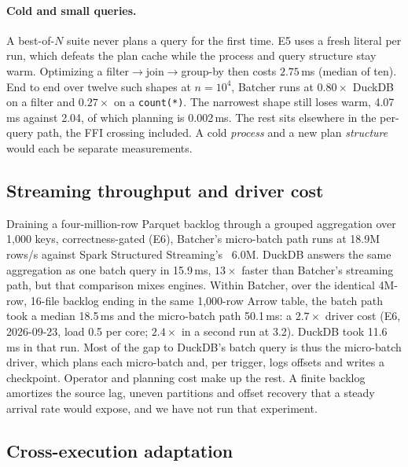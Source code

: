 \documentclass[10pt,twocolumn,letterpaper]{article}   %
\newcommand{\sys}{Batcher}
\newcommand{\E}[1]{\textsf{E#1}}
\begin{document}
\paragraph{Cold and small queries.}
\label{sec:smallquery}
A best-of-$N$ suite never plans a query for the first time. \E{5} uses a fresh literal per run,
which defeats the plan cache while the process and query structure stay warm. Optimizing a
filter$\rightarrow$join$\rightarrow$group-by then costs $2.75$\,ms (median of ten). End to end
over twelve such shapes at $n=10^4$, \sys{} runs at $0.80\times$ DuckDB on a filter and
$0.27\times$ on a \texttt{count(*)}. The narrowest shape still loses warm, 4.07\,ms against 2.04,
of which planning is 0.002\,ms. The rest sits elsewhere in the per-query path, the FFI crossing
included. A cold \emph{process} and a new plan \emph{structure} would each be separate
measurements.

\subsection{Streaming throughput and driver cost}
\label{sec:eval-streaming}

Draining a four-million-row Parquet backlog through a grouped aggregation over 1{,}000 keys,
correctness-gated (\E{6}), \sys{}'s micro-batch path runs at 18.9M rows/s against Spark
Structured Streaming's~\cite{armbrust2018structured} 6.0M. DuckDB answers the same aggregation
as one batch query in 15.9\,ms, $13\times$ faster than \sys{}'s streaming path, but that
comparison mixes engines. Within \sys{}, over the identical 4M-row, 16-file backlog ending in
the same 1{,}000-row Arrow table, the batch path took a median 18.5\,ms and the micro-batch path
50.1\,ms: a $2.7\times$ driver cost (\E{6}, 2026-09-23, load 0.5 per core; $2.4\times$ in a
second run at 3.2). DuckDB took 11.6\,ms in that run. Most of the gap to DuckDB's batch query is
thus the micro-batch driver, which plans each micro-batch and, per trigger, logs offsets and
writes a checkpoint. Operator and planning cost make up the rest. A finite backlog amortizes the
source lag, uneven partitions and offset recovery that a steady arrival rate would expose, and
we have not run that experiment.

\subsection{Cross-execution adaptation}
\label{sec:eval-learning}
\end{document}
